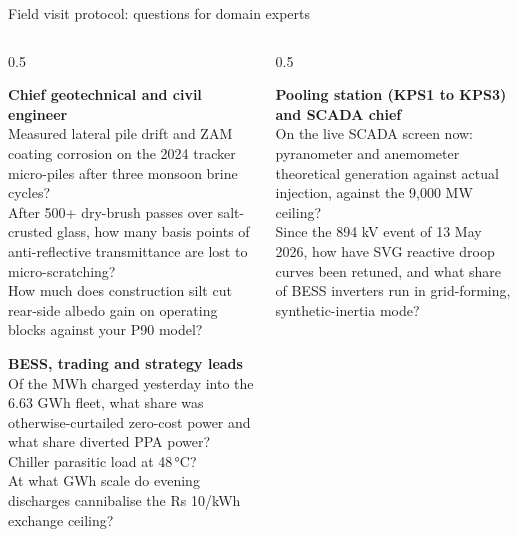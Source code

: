 \documentclass[aspectratio=169,10pt,t]{beamer}
\begin{document}
\begin{frame}{Field visit protocol: questions for domain experts}
  \begin{columns}[T]
    \begin{column}{0.5\textwidth}
      \begin{tcolorbox}[colback=SpLightGray,colframe=SpLightGray,arc=3pt,left=2.5mm,right=2.5mm,top=1mm,bottom=1mm,boxsep=0.5mm]
        {\footnotesize\textbf{Chief geotechnical and civil engineer}}\\[2pt]
        {\scriptsize
        Measured lateral pile drift and ZAM coating corrosion on the 2024 tracker micro-piles after three monsoon brine cycles?\\[2pt]
        After 500+ dry-brush passes over salt-crusted glass, how many basis points of anti-reflective transmittance are lost to micro-scratching?\\[2pt]
        How much does construction silt cut rear-side albedo gain on operating blocks against your P90 model?}
      \end{tcolorbox}
      \begin{tcolorbox}[colback=OrangeTint,colframe=OrangeTint,arc=3pt,left=2.5mm,right=2.5mm,top=1mm,bottom=1mm,boxsep=0.5mm]
        {\footnotesize\textbf{BESS, trading and strategy leads}}\\[2pt]
        {\scriptsize
        Of the MWh charged yesterday into the 6.63 GWh fleet, what share was otherwise-curtailed zero-cost power and what share diverted PPA power? Chiller parasitic load at 48\,°C?\\[2pt]
        At what GWh scale do evening discharges cannibalise the Rs 10/kWh exchange ceiling?}
      \end{tcolorbox}
    \end{column}
    \begin{column}{0.5\textwidth}
      \begin{tcolorbox}[colback=white,colframe=Grey,arc=3pt,left=2.5mm,right=2.5mm,top=1mm,bottom=1mm,boxsep=0.5mm]
        {\footnotesize\textbf{Pooling station (KPS1 to KPS3) and SCADA chief}}\\[2pt]
        {\scriptsize
        On the live SCADA screen now: pyranometer and anemometer theoretical generation against actual injection, against the 9,000 MW ceiling?\\[2pt]
        Since the 894 kV event of 13 May 2026, how have SVG reactive droop curves been retuned, and what share of BESS inverters run in grid-forming, synthetic-inertia mode?}

\end{tcolorbox}
\end{column}
\end{columns}
\end{frame}
\end{document}
